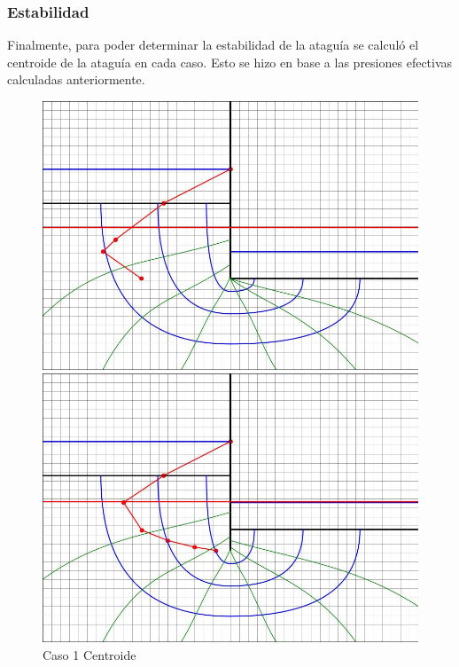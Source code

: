 \subsubsection{Estabilidad}
Finalmente, para poder determinar la estabilidad de la ataguía se calculó el centroide de la ataguía en cada caso. Esto se hizo en base a las presiones efectivas calculadas anteriormente.
\begin{figure}[H]
    \centering
    \begin{minipage}{0.32\textwidth}
        \centering
        \includegraphics[width=\textwidth]{GRAFICOS/caso_1_centroide_y.jpg}
        \caption{Caso 1 Centroide}
        \label{fig:caso_1_centroide_y}
    \end{minipage}
    \begin{minipage}{0.32\textwidth}
        \centering
        \includegraphics[width=\textwidth]{GRAFICOS/caso_2_centroide_y.jpg}

\end{minipage}
\end{figure}
